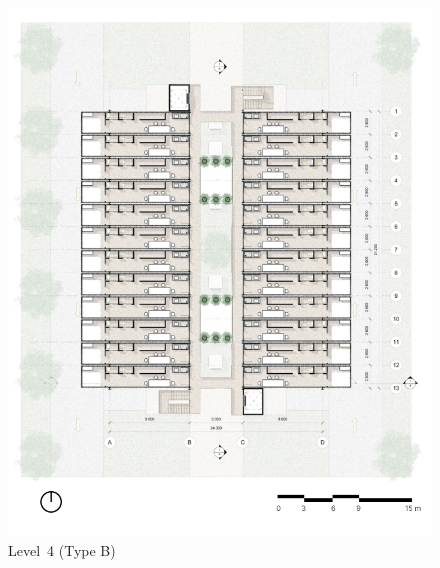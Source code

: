 ﻿%
\begin{figure}[H]
	\centering
	\includegraphics[width=\linewidth]{src/graphics/container-village--level-04.jpg}
	\caption*{%
		Level~4 (Type B)
	}
	\label{
		fig:container-village--level-04
	}
\end{figure}
